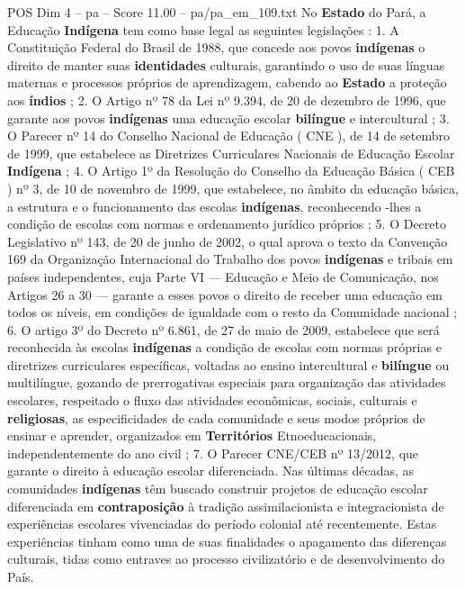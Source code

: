 \begin{textsample}{POS Dim 4 – pa – Score 11.00 – pa/pa\_em\_109.txt}  \label{ex:f4_pos_020}
No \textbf{Estado} do Pará, a Educação \textbf{Indígena} tem como base legal as seguintes legislações : 1.
A Constituição Federal do Brasil de 1988, que concede aos povos \textbf{indígenas} o direito de manter suas \textbf{identidades} culturais, garantindo o uso de suas línguas maternas e processos próprios de aprendizagem, cabendo ao \textbf{Estado} a proteção aos \textbf{índios} ; 2.
O Artigo nº 78 da Lei nº 9.394, de 20 de dezembro de 1996, que garante aos povos \textbf{indígenas} uma educação escolar \textbf{bilíngue} e intercultural ; 3.
O Parecer nº 14 do Conselho Nacional de Educação ( CNE ), de 14 de setembro de 1999, que estabelece as Diretrizes Curriculares Nacionais de Educação Escolar \textbf{Indígena} ; 4.
O Artigo 1º da Resolução do Conselho da Educação Básica ( CEB ) nº 3, de 10 de novembro de 1999, que estabelece, no âmbito da educação básica, a estrutura e o funcionamento das escolas \textbf{indígenas}, reconhecendo -lhes a condição de escolas com normas e ordenamento jurídico próprios ; 5.
O Decreto Legislativo nº 143, de 20 de junho de 2002, o qual aprova o texto da Convenção 169 da Organização Internacional do Trabalho dos povos \textbf{indígenas} e tribais em países independentes, cuja Parte VI — Educação e Meio de Comunicação, nos Artigos 26 a 30 — garante a esses povos o direito de receber uma educação em todos os níveis, em condições de igualdade com o resto da Comunidade nacional ; 6.
O artigo 3º do Decreto nº 6.861, de 27 de maio de 2009, estabelece que será reconhecida às escolas \textbf{indígenas} a condição de escolas com normas próprias e diretrizes curriculares específicas, voltadas ao ensino intercultural e \textbf{bilíngue} ou multilíngue, gozando de prerrogativas especiais para organização das atividades escolares, respeitado o fluxo das atividades econômicas, sociais, culturais e \textbf{religiosas}, as especificidades de cada comunidade e seus modos próprios de ensinar e aprender, organizados em \textbf{Territórios} Etnoeducacionais, independentemente do ano civil ; 7.
O Parecer CNE/CEB nº 13/2012, que garante o direito à educação escolar diferenciada.
Nas últimas décadas, as comunidades \textbf{indígenas} têm buscado construir projetos de educação escolar diferenciada em \textbf{contraposição} à tradição assimilacionista e integracionista de experiências escolares vivenciadas do período colonial até recentemente.
Estas experiências tinham como uma de suas finalidades o apagamento das diferenças culturais, tidas como entraves ao processo civilizatório e de desenvolvimento do País.

\end{textsample}
